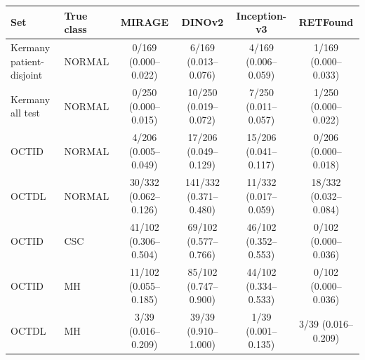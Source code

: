 \begin{tabular}{@{}llcccc@{}}
\toprule
Set & True class & MIRAGE & DINOv2 & Inception-v3 & RETFound \\
\midrule
Kermany patient-disjoint & NORMAL & 0/169 (0.000--0.022) & 6/169 (0.013--0.076) & 4/169 (0.006--0.059) & 1/169 (0.000--0.033) \\
Kermany all test & NORMAL & 0/250 (0.000--0.015) & 10/250 (0.019--0.072) & 7/250 (0.011--0.057) & 1/250 (0.000--0.022) \\
OCTID & NORMAL & 4/206 (0.005--0.049) & 17/206 (0.049--0.129) & 15/206 (0.041--0.117) & 0/206 (0.000--0.018) \\
OCTDL & NORMAL & 30/332 (0.062--0.126) & 141/332 (0.371--0.480) & 11/332 (0.017--0.059) & 18/332 (0.032--0.084) \\
OCTID & CSC & 41/102 (0.306--0.504) & 69/102 (0.577--0.766) & 46/102 (0.352--0.553) & 0/102 (0.000--0.036) \\
OCTID & MH & 11/102 (0.055--0.185) & 85/102 (0.747--0.900) & 44/102 (0.334--0.533) & 0/102 (0.000--0.036) \\
OCTDL & MH & 3/39 (0.016--0.209) & 39/39 (0.910--1.000) & 1/39 (0.001--0.135) & 3/39 (0.016--0.209) \\
\bottomrule
\end{tabular}
